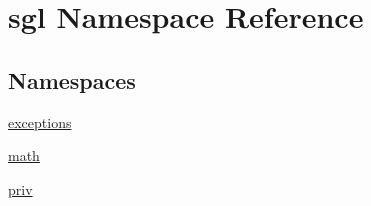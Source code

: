 \hypertarget{namespacesgl}{}\section{sgl Namespace Reference}
\label{namespacesgl}
\subsection*{Namespaces}
\begin{DoxyCompactItemize}
\item 
 \mbox{\hyperlink{namespacesgl_1_1exceptions}{exceptions}}
\item 
 \mbox{\hyperlink{namespacesgl_1_1math}{math}}
\item 
 \mbox{\hyperlink{namespacesgl_1_1priv}{priv}}
\end{DoxyCompactItemize}
